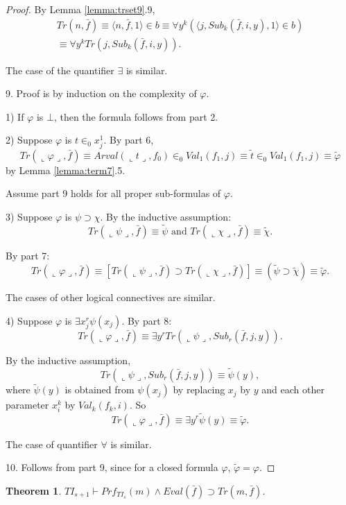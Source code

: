 \documentclass{asl}
\newtheorem{theorem}{Theorem}[section]
\theoremstyle{definition}
\begin{document}
\begin{proof}
By Lemma \ref{lemma:trset9}.9,
\begin{multline*}
Tr( n,\bar{f})
\equiv \langle n,\bar{f},1\rangle \in b\equiv
\forall y^k\left(\langle j,Sub_k(\bar{f},i,y),1\rangle \in b \right) 
\\
\equiv \forall y^k Tr(j,Sub_k(\bar{f},i,y)).
\end{multline*} 

The case of the quantifier $\exists$ is similar.

9. Proof is by induction on the complexity of $\varphi$.
 
1) If $\varphi$ is $\bot$, then the formula follows from part 2.

2) Suppose $\varphi$ is $t\in_0 x_j^1$. By part 6,
\[Tr(\llcorner\varphi\lrcorner,\bar{f})\equiv Arval(\llcorner t\lrcorner,f_0)\in_0 Val_1(f_1,j)\equiv \tilde{t}\in_0 Val_1(f_1,j)\equiv\tilde{\varphi}\]
by Lemma \ref{lemma:term7}.5.

Assume part 9 holds for all proper sub-formulas of $\varphi$. 

3) Suppose $\varphi$ is $\psi\supset\chi$. By the inductive assumption:
\[Tr(\llcorner\psi\lrcorner,\bar{f})\equiv \tilde{\psi} \text{ and }Tr(\llcorner\chi\lrcorner,\bar{f})\equiv \tilde{\chi}.\]

By part 7:
\[Tr(\llcorner\varphi\lrcorner,\bar{f})\equiv \left[Tr(\llcorner\psi\lrcorner,\bar{f})\supset Tr(\llcorner\chi\lrcorner,\bar{f}) \right] \equiv (\tilde{\psi}\supset \tilde{\chi})\equiv\tilde{\varphi}.\]

The cases of other logical connectives are similar.

4) Suppose $\varphi$ is $\exists x_j^r\psi(x_j)$. By part 8:
\[Tr(\llcorner\varphi\lrcorner,\bar{f})\equiv\exists y^r Tr(\llcorner\psi\lrcorner,Sub_r(\bar{f},j,y)).\] 

By the inductive assumption,
\[Tr(\llcorner\psi\lrcorner,Sub_r(\bar{f},j,y))\equiv \tilde{\psi}(y),\]
where $\tilde{\psi}(y)$ is obtained from $\psi(x_j)$ by replacing $x_j$ by $y$ and each other parameter $x_i^k$ by $Val_k(f_k,i)$. So
\[Tr(\llcorner\varphi\lrcorner,\bar{f})\equiv\exists y^r \tilde{\psi}(y)\equiv\tilde{\varphi}.\] 

The case of quantifier $\forall$ is similar.

10. Follows from part 9, since for a closed formula $\varphi$, $\tilde{\varphi}=\varphi$.
\end{proof}

\begin{theorem}
$TI_{s+1}\vdash Prf_{TI_s}(m)\wedge Eval(\bar{f})\supset Tr(m,\bar{f})$.
\label{theorem:proof}
\end{theorem}
\end{document}
